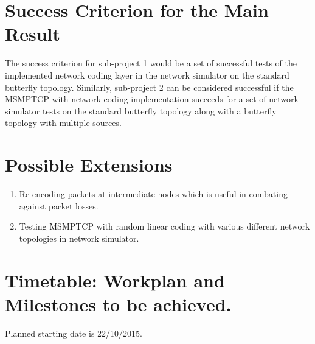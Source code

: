 \documentclass[12pt,a4paper,twoside]{article}
\begin{document}
\section*{Success Criterion for the Main Result}

The success criterion for sub-project 1 would be a set of successful tests of the implemented network coding layer in the network simulator on the standard butterfly topology. Similarly, sub-project 2 can be considered successful if the MSMPTCP with network coding implementation succeeds for a set of network simulator tests on the standard butterfly topology along with a butterfly topology with multiple sources. 

\section*{Possible Extensions}

\begin{enumerate}
  \item Re-encoding packets at intermediate nodes which is useful in combating against packet losses.
  \item Testing MSMPTCP with random linear coding with various different network topologies in network simulator.
\end{enumerate}

\section*{Timetable: Workplan and Milestones to be achieved.}

Planned starting date is 22/10/2015.
\end{document}
